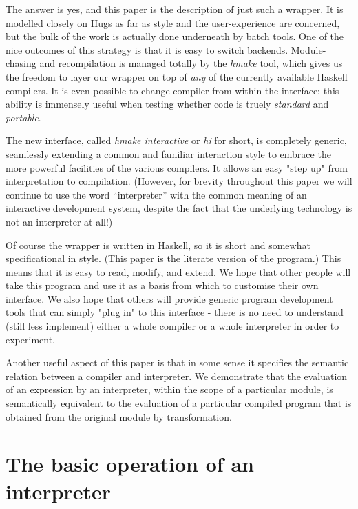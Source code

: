 \documentclass[a4paper]{article}
\begin{document}
The answer is yes, and this paper is the description of just such
a wrapper.  It is modelled closely on Hugs as far as style and the
user-experience are concerned, but the bulk of the work is actually
done underneath by batch tools.  One of the nice outcomes of this
strategy is that it is easy to switch backends.  Module-chasing and
recompilation is managed totally by the {\em hmake} tool, which
gives us the freedom to layer our wrapper on top of {\em any} of the
currently available Haskell compilers.  It is even possible to change
compiler from within the interface: this ability is immensely useful
when testing whether code is truely {\em standard} and {\em portable}.

The new interface, called {\em hmake interactive} or {\em hi}
for short, is completely generic, seamlessly extending a common and
familiar interaction style to embrace the more powerful facilities of
the various compilers.  It allows an easy "step up" from interpretation
to compilation.  (However, for brevity throughout this paper we will
continue to use the word ``interpreter'' with the common meaning of an
interactive development system, despite the fact that the underlying
technology is not an interpreter at all!)

Of course the wrapper is written in Haskell, so it is short and
somewhat specificational in style.  (This paper is the literate
version of the program.)  This means that it is easy to read, modify,
and extend.  We hope that other people will take this program and
use it as a basis from which to customise their own interface.
We also hope that others will provide generic program development
tools that can simply "plug in" to this interface - there is no need
to understand (still less implement) either a whole compiler or a
whole interpreter in order to experiment.

Another useful aspect of this paper is that in some sense it
specifies the semantic relation between a compiler and interpreter.
We demonstrate that the evaluation of an expression by an interpreter,
within the scope of a particular module, is semantically equivalent
to the evaluation of a particular compiled program that is obtained
from the original module by transformation.




\section*{The basic operation of an interpreter}
\end{document}
